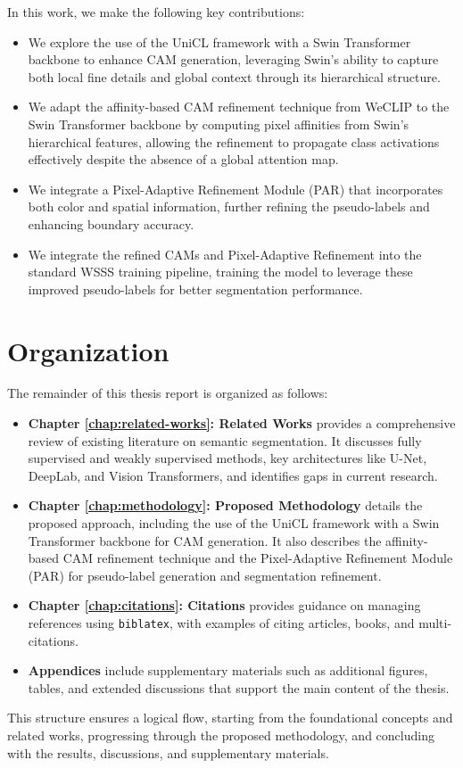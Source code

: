In this work, we make the following key contributions:

\begin{itemize}
    \item We explore the use of the UniCL framework \cite{vl_unicl} with a Swin Transformer backbone \cite{transformer_swin} to enhance CAM generation, leveraging Swin's ability to capture both local fine details and global context through its hierarchical structure.
    \item We adapt the affinity-based CAM refinement technique from WeCLIP \cite{wsss_frozen_clip} to the Swin Transformer backbone by computing pixel affinities from Swin's hierarchical features, allowing the refinement to propagate class activations effectively despite the absence of a global attention map.
    \item We integrate a Pixel-Adaptive Refinement Module (PAR) \cite{wsss_afa_affinity_from_attention} that incorporates both color and spatial information, further refining the pseudo-labels and enhancing boundary accuracy.
    \item We integrate the refined CAMs and Pixel-Adaptive Refinement into the standard WSSS training pipeline, training the model to leverage these improved pseudo-labels for better segmentation performance.

\end{itemize}

\section{Organization}
\label{sec:organization}

The remainder of this thesis report is organized as follows:

\begin{itemize}
    \item \textbf{Chapter \ref{chap:related-works}: Related Works} provides a comprehensive review of existing literature on semantic segmentation. It discusses fully supervised and weakly supervised methods, key architectures like U-Net, DeepLab, and Vision Transformers, and identifies gaps in current research.

    \item \textbf{Chapter \ref{chap:methodology}: Proposed Methodology} details the proposed approach, including the use of the UniCL framework with a Swin Transformer backbone for CAM generation. It also describes the affinity-based CAM refinement technique and the Pixel-Adaptive Refinement Module (PAR) for pseudo-label generation and segmentation refinement.

    \item \textbf{Chapter \ref{chap:citations}: Citations} provides guidance on managing references using \texttt{biblatex}, with examples of citing articles, books, and multi-citations.

    \item \textbf{Appendices} include supplementary materials such as additional figures, tables, and extended discussions that support the main content of the thesis.
\end{itemize}

This structure ensures a logical flow, starting from the foundational concepts and related works, progressing through the proposed methodology, and concluding with the results, discussions, and supplementary materials.


